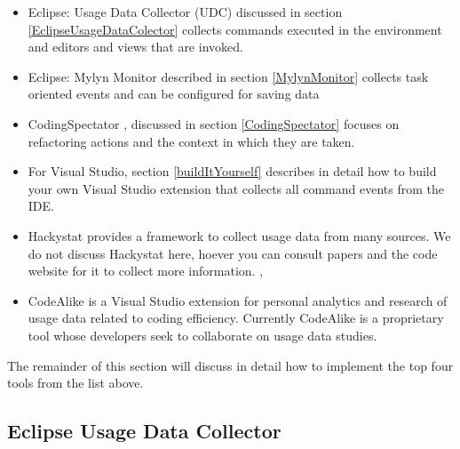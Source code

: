\begin{itemize}

	\item Eclipse: Usage Data Collector (UDC) discussed in section \ref{EclipseUsageDataColector} collects commands executed in the environment and editors and views that are invoked.
	
	\item Eclipse: Mylyn Monitor described in section \ref{MylynMonitor} collects task oriented events and can be configured for saving data
	
	\item CodingSpectator %
, discussed in section \ref{CodingSpectator} focuses on refactoring actions and the context in which they are taken.
	
	\item For Visual Studio, section \ref{buildItYourself} describes in detail how to build your own Visual Studio extension that collects all command events from the IDE.
	
	\item Hackystat provides a framework to collect usage data from many sources.  We do not discuss Hackystat here, hoever you can consult papers and the code website for it to collect more information. \cite{V:johnson2003beyond}, %
	
	\item CodeAlike is a Visual Studio extension for personal analytics and research of usage data related to coding efficiency.  Currently CodeAlike is a proprietary tool whose developers seek to collaborate on usage data studies.

\end{itemize}


The remainder of this section will discuss in detail how to implement the top four tools from the list above.  

\subsection{Eclipse Usage Data Collector}
\label{EclipseUsageDataCollector}



